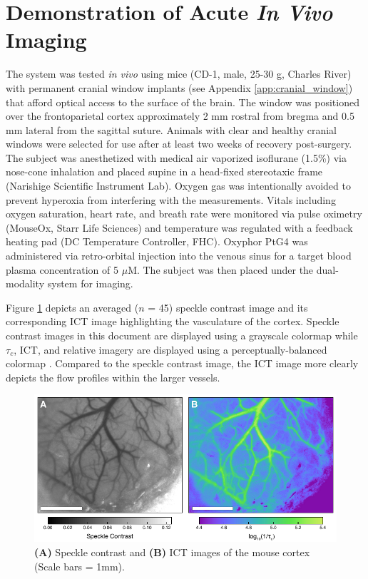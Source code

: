 \section{Demonstration of Acute \textit{In Vivo} Imaging}

The system was tested \textit{in vivo} using mice (CD-1, male, 25-30 g, Charles River) with permanent cranial window implants (see Appendix \ref{app:cranial_window}) that afford optical access to the surface of the brain. The window was positioned over the frontoparietal cortex approximately 2 mm rostral from bregma and 0.5 mm lateral from the sagittal suture. Animals with clear and healthy cranial windows were selected for use after at least two weeks of recovery post-surgery. The subject was anesthetized with medical air vaporized isoflurane (1.5\%) via nose-cone inhalation and placed supine in a head-fixed stereotaxic frame (Narishige Scientific Instrument Lab). Oxygen gas was intentionally avoided to prevent hyperoxia from interfering with the  measurements. Vitals including oxygen saturation, heart rate, and breath rate were monitored via pulse oximetry (MouseOx, Starr Life Sciences) and temperature was regulated with a feedback heating pad (DC Temperature Controller, FHC). Oxyphor PtG4 was administered via retro-orbital injection into the venous sinus for a target blood plasma concentration of 5 $\mu$M. The subject was then placed under the dual-modality system for imaging.

Figure \ref{fig:staticspeckle} depicts an averaged ($n$ = 45) speckle contrast image and its corresponding ICT image highlighting the vasculature of the cortex. Speckle contrast images in this document are displayed using a grayscale colormap while $\tau_c$, ICT, and relative imagery are displayed using a perceptually-balanced colormap \cite{Niccoli:vx}. Compared to the speckle contrast image, the ICT image more clearly depicts the flow profiles within the larger vessels.

\begin{figure}
    \includegraphics{figures/chapter_2/staticspeckle.pdf}
    \caption {
        \label{fig:staticspeckle}
        \textbf{(A)} Speckle contrast and \textbf{(B)} ICT images of the mouse cortex (Scale bars = 1mm).
    }
\end{figure}

